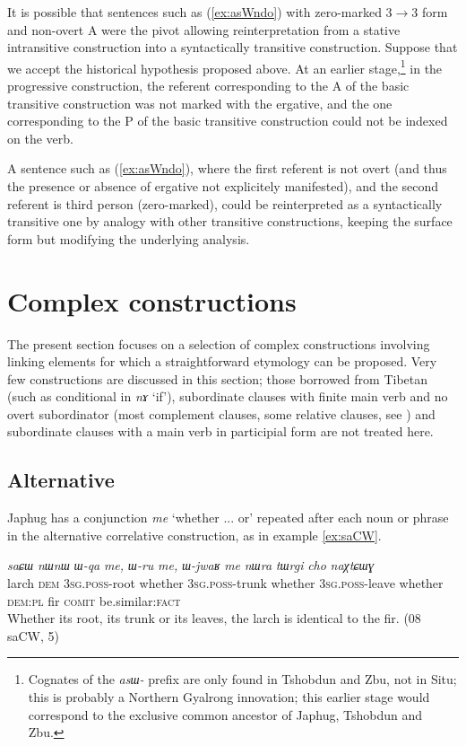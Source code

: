 \documentclass[oneside,a4paper,11pt]{article}
\newcommand{\ipa}[1]{\mbox{\phon\textit{#1}}} %
\begin{document}
It is possible that sentences such as (\ref{ex:asWndo}) with zero-marked 3$\rightarrow$3 form and non-overt A were the pivot allowing reinterpretation from a stative intransitive construction into a syntactically transitive construction. Suppose that we accept the historical hypothesis proposed above. At an earlier stage,\footnote{Cognates of the \ipa{asɯ-} prefix are only found in Tshobdun and Zbu, not in Situ; this is probably a Northern Gyalrong innovation; this earlier stage would correspond to the exclusive common ancestor of Japhug, Tshobdun and Zbu.} in the progressive construction, the referent corresponding to the A of the basic transitive construction was not marked with the ergative, and the one corresponding to the P of the basic transitive construction could not be indexed on the verb. 

A sentence such as (\ref{ex:asWndo}), where the first referent is not overt (and thus the presence or absence of ergative not explicitely manifested), and the second referent is third person (zero-marked),  could be reinterpreted as a syntactically transitive one by analogy with other transitive constructions, keeping the surface form but modifying the underlying analysis.

\section{Complex constructions} 
The present section focuses on a selection of complex constructions involving linking elements for which a straightforward etymology can be proposed.  Very few constructions are discussed in this section; those borrowed from Tibetan (such as conditional in \ipa{nɤ} `if'), subordinate clauses with finite main verb and no overt subordinator   (most complement clauses, some relative clauses, see \citealt{jacques16relatives}) and subordinate clauses with a main verb in participial form are not treated here.

\subsection{Alternative}
 Japhug has a conjunction \ipa{me}  `whether ... or' repeated after each noun or phrase in the alternative correlative construction, as in example \ref{ex:saCW}.
 
\begin{exe}
\ex \label{ex:saCW}
\gll  \ipa{saɕɯ} 	\ipa{nɯnɯ} 	\ipa{ɯ-qa} 	\ipa{me,} 	\ipa{ɯ-ru} 	\ipa{me,} 	\ipa{ɯ-jwaʁ} 	\ipa{me} 	\ipa{nɯra} 	\ipa{tɯrgi} 	\ipa{cho} 	\ipa{naχtɕɯɣ} \\
 larch \textsc{dem} \textsc{3sg.poss}-root whether \textsc{3sg.poss}-trunk whether \textsc{3sg.poss}-leave whether \textsc{dem:pl} fir  \textsc{comit} be.similar:\textsc{fact} \\
\glt Whether its root, its trunk or its leaves, the larch is identical to the fir. (08 saCW, 5)
\end{exe} 
\end{document}
